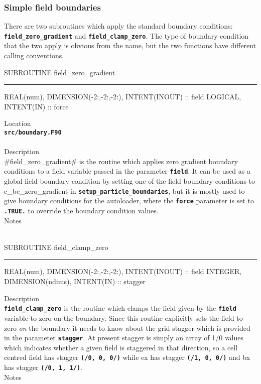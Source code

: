\documentclass[12pt,a4paper]{article}
\newcommand{\HRule}{\rule[0.3cm]{\linewidth}{0.5mm}}
\newcommand{\inlinecode}[1]{{\color{warwickred} \bf\texttt{#1}}}
\begin{document}
\subsubsection{Simple field boundaries}
There are two subroutines which apply the standard boundary conditions:
\inlinecode{field\_zero\_gradient} and \inlinecode{field\_clamp\_zero}. The
type of boundary condition that the two apply is obvious from the name, but
the two functions have different calling conventions.

\pagebreak
\begin{codedef}
SUBROUTINE field_zero_gradient
\HRule
REAL(num), DIMENSION(-2:,-2:,-2:), INTENT(INOUT) :: field
LOGICAL, INTENT(IN) :: force
\end{codedef}
\vspace{1cm}
{\Large Location\\}
\inlinecode{src/boundary.F90}\\
\\[0.5cm]
{\Large Description\\}
#field_zero_gradient# is the routine which applies zero gradient
boundary conditions to a field variable passed in the parameter
\inlinecode{field}. It can be used as a global field boundary condition by
setting one of the field boundary conditions to c\_bc\_zero\_gradient in
\inlinecode{setup\_particle\_boundaries}, but it is mostly used to give
boundary conditions for the autoloader, where the \inlinecode{force} parameter
is set to \inlinecode{.TRUE.} to override the boundary condition values.
\\[0.5cm]
{\Large Notes\\ \\}

\pagebreak
\begin{codedef}
SUBROUTINE field_clamp_zero
\HRule
REAL(num), DIMENSION(-2:,-2:,-2:), INTENT(INOUT) :: field
INTEGER, DIMENSION(ndims), INTENT(IN) :: stagger
\end{codedef}
\vspace{1cm}
{\Large Description\\}
\inlinecode{field\_clamp\_zero} is the routine which clamps the field given by
the \inlinecode{field} variable to zero on the boundary. Since this routine
explicitly sets the field to zero {\it on} the boundary it needs to know about
the grid stagger which is provided in the parameter \inlinecode{stagger}. At
present stagger is simply an array of 1/0 values which indicates whether a
given field is staggered in that direction, so a cell centred field has
stagger \inlinecode{(/0, 0, 0/)} while ex has stagger \inlinecode{(/1, 0, 0/)}
and bx has stagger \inlinecode{(/0, 1, 1/)}.
\\[0.5cm]
{\Large Notes\\}
\pagebreak
\end{document}
